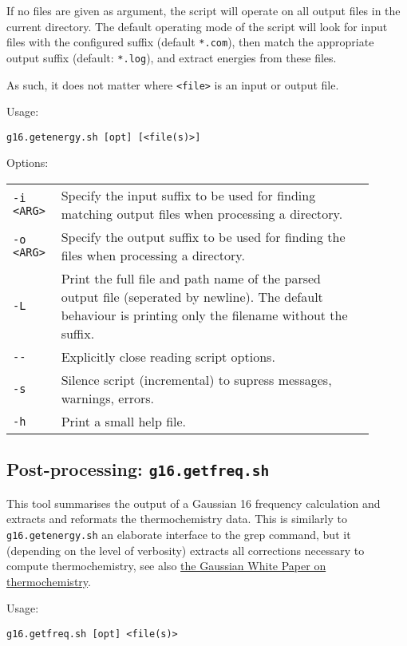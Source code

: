 \documentclass[   %
  final,          %
  a4paper         %
]{article}
\begin{document}
If no files are given as argument, the script will operate on all output files in the current directory.
The default operating mode of the script will look for input files with the configured suffix (default \texttt{*.com}),
then match the appropriate output suffix (default: \texttt{*.log}),
and extract energies from these files.

As such, it does not matter where \lstinline`<file>` is an input or output file.

Usage: 

\lstinline`g16.getenergy.sh [opt] [<file(s)>]`

Options: 

\begin{tabular}{p{0.1\linewidth}p{0.8\linewidth}}
  {\lstinline`-i <ARG>`} & Specify the input suffix to be used for finding matching output files when processing a directory. \\
  {\lstinline`-o <ARG>`} & Specify the output suffix to be used for finding the files when processing a directory. \\
  {\lstinline`-L`}       & Print the full file and path name of the parsed output file (seperated by newline). 
    The default behaviour is printing only the filename without the suffix. \\
  {\lstinline`--`}       & Explicitly close reading script options. \\
  {\lstinline`-s`}       & Silence script (incremental) to supress messages, warnings, errors. \\
  {\lstinline`-h`}       & Print a small help file. \\
\end{tabular}

\subsection{Post-processing: \texorpdfstring{{\lstinline`g16.getfreq.sh`}}{g16.getfreq.sh}}

This tool summarises the output of a Gaussian 16 frequency calculation 
and extracts and reformats the thermochemistry data.
This is similarly to \lstinline`g16.getenergy.sh` an elaborate interface to the grep command,
but it (depending on the level of verbosity) extracts all corrections necessary 
to compute thermochemistry, see also 
\href{http://gaussian.com/thermo/}{the Gaussian White Paper on thermochemistry}.

Usage: 

\lstinline`g16.getfreq.sh [opt] <file(s)>`
\end{document}
